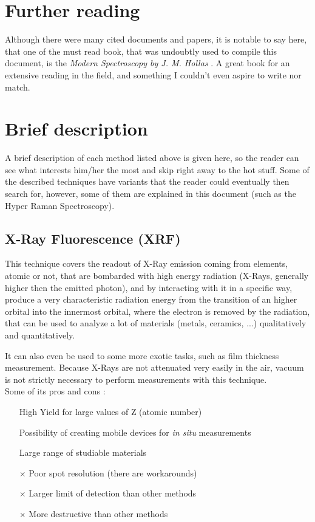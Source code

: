 \documentclass[]{report}
\begin{document}
\section{Further reading}
Although there were many cited documents and papers, it is notable to say here, that one of the must read book, that was undoubtly used to compile this document, is the \textit{Modern Spectroscopy by J. M. Hollas} \cite{JMH_Modern}. A great book for an extensive reading in the field, and something I couldn't even aspire to write nor match.

\section{Brief description}
A brief description of each method listed above is given here, so the reader can see what interests him/her the most and skip right away to the hot stuff. Some of the described techniques have variants that the reader could eventually then search for, however, some of them are explained in this document (such as the Hyper Raman Spectroscopy).

\subsection{X-Ray Fluorescence (XRF)} \label{XRF}
This technique covers the readout of X-Ray emission coming from elements, atomic or not, that are bombarded with high energy radiation (X-Rays, generally higher then the emitted photon), and by interacting with it in a specific way, produce a very characteristic radiation energy from the transition of an higher orbital into the innermost orbital, where the electron is removed by the radiation, that can be used to analyze a lot of materials (metals, ceramics, ...) qualitatively and quantitatively. 
\par It can also even be used to some more exotic tasks, such as film thickness measurement. Because X-Rays are not attenuated very easily in the air, vacuum is not strictly necessary to perform measurements with this technique.\\

Some of its pros and cons \cite{GI_XRF}:
\begin{itemize}
\item[\checkmark] High Yield for large values of Z (atomic number)
\item[\checkmark] Possibility of creating mobile devices for \textit{in situ} measurements
\item[\checkmark] Large range of studiable materials
\item[$\times$] Poor spot resolution (there are workarounds)
\item[$\times$] Larger limit of detection than other methods
\item[$\times$] More destructive than other methods
\end{itemize}
\end{document}
